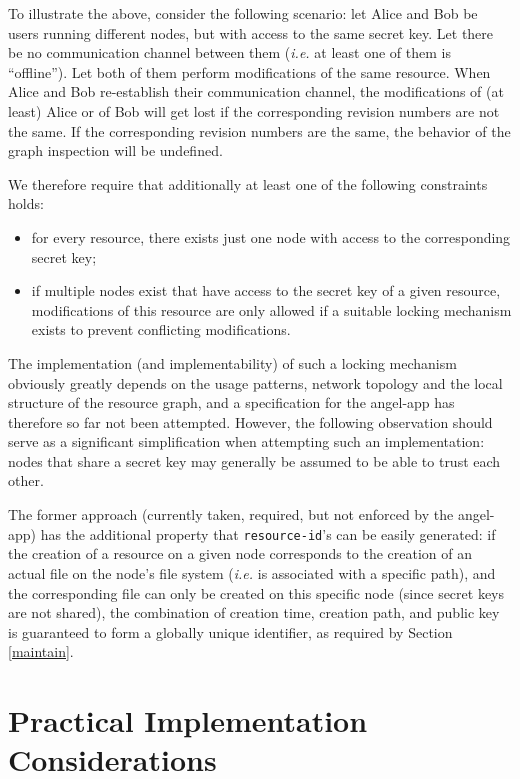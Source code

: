 \documentclass[11pt]{article}
\begin{document}
\begin{mainmatter}
To illustrate the above, consider the following scenario: let Alice and Bob be users running different nodes, but with access to the same secret key. Let there be no communication channel between them (\emph{i.e.} at least one of them is ``offline''). Let both of them perform modifications of the same resource. When Alice and Bob re-establish their communication channel, the modifications of (at least) Alice or of Bob will get lost if the corresponding revision numbers are not the same. If the corresponding revision numbers are the same, the behavior of the graph inspection will be undefined. 

We therefore require that additionally at least one of the following constraints holds:
\begin{itemize}
\item for every resource, there exists just one node with access to the corresponding secret key;
\item if multiple nodes exist that have access to the secret key of a given resource, modifications of this resource are only allowed if a suitable locking mechanism exists to prevent conflicting modifications. 
\end{itemize}
The implementation (and implementability) of such a locking mechanism obviously greatly depends on the usage patterns, network topology and the local structure of the resource graph, and a specification for the angel-app has therefore so far not been attempted. However, the following observation should serve as a significant simplification when attempting such an implementation: nodes that share a secret key may generally be assumed to be able to trust each other.

The former approach (currently taken, required, but not enforced by the angel-app) has the additional property that \texttt{resource-id}'s can be easily generated: if the creation of a resource on a given node corresponds to the creation of an actual file on the node's file system (\emph{i.e.} is associated with a specific path), and the corresponding file can only be created on this specific node (since secret keys are not shared), the combination of creation time, creation path, and public key is guaranteed to form a globally unique identifier, as required by Section \ref{maintain}.

\section{Practical Implementation Considerations}


\end{mainmatter}
\end{document}
